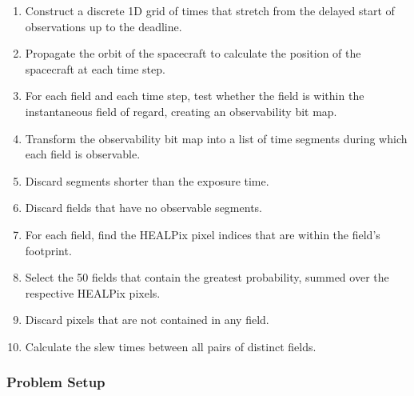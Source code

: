 \documentclass[twocolumn,times]{aastex631}
\begin{document}
\begin{enumerate}
    \item Construct a discrete 1D grid of times that stretch from the delayed start of observations up to the deadline.
    \item Propagate the orbit of the spacecraft to calculate the position of the spacecraft at each time step.
    \item For each field and each time step, test whether the field is within the instantaneous field of regard, creating an observability bit map.
    \item Transform the observability bit map into a list of time segments during which each field is observable.
    \item Discard segments shorter than the exposure time.
    \item Discard fields that have no observable segments.
    \item For each field, find the \ac{HEALPix} pixel indices that are within the field's footprint.
    \item Select the 50 fields that contain the greatest probability, summed over the respective \ac{HEALPix} pixels.
    \item Discard pixels that are not contained in any field.
    \item Calculate the slew times between all pairs of distinct fields.
\end{enumerate}

\subsubsection{Problem Setup}
\end{document}
